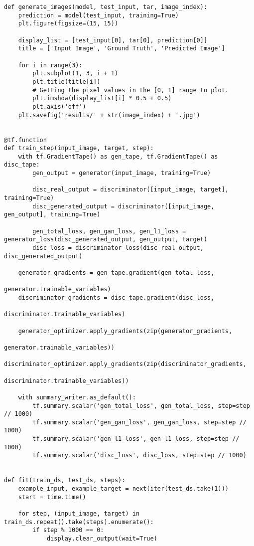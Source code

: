 \begin{lstlisting}
def generate_images(model, test_input, tar, image_index):
    prediction = model(test_input, training=True)
    plt.figure(figsize=(15, 15))

    display_list = [test_input[0], tar[0], prediction[0]]
    title = ['Input Image', 'Ground Truth', 'Predicted Image']

    for i in range(3):
        plt.subplot(1, 3, i + 1)
        plt.title(title[i])
        # Getting the pixel values in the [0, 1] range to plot.
        plt.imshow(display_list[i] * 0.5 + 0.5)
        plt.axis('off')
    plt.savefig('results/' + str(image_index) + '.jpg')


@tf.function
def train_step(input_image, target, step):
    with tf.GradientTape() as gen_tape, tf.GradientTape() as disc_tape:
        gen_output = generator(input_image, training=True)

        disc_real_output = discriminator([input_image, target], training=True)
        disc_generated_output = discriminator([input_image, gen_output], training=True)

        gen_total_loss, gen_gan_loss, gen_l1_loss = generator_loss(disc_generated_output, gen_output, target)
        disc_loss = discriminator_loss(disc_real_output, disc_generated_output)

    generator_gradients = gen_tape.gradient(gen_total_loss,
                                            generator.trainable_variables)
    discriminator_gradients = disc_tape.gradient(disc_loss,
                                                 discriminator.trainable_variables)

    generator_optimizer.apply_gradients(zip(generator_gradients,
                                            generator.trainable_variables))
    discriminator_optimizer.apply_gradients(zip(discriminator_gradients,
                                                discriminator.trainable_variables))

    with summary_writer.as_default():
        tf.summary.scalar('gen_total_loss', gen_total_loss, step=step // 1000)
        tf.summary.scalar('gen_gan_loss', gen_gan_loss, step=step // 1000)
        tf.summary.scalar('gen_l1_loss', gen_l1_loss, step=step // 1000)
        tf.summary.scalar('disc_loss', disc_loss, step=step // 1000)


def fit(train_ds, test_ds, steps):
    example_input, example_target = next(iter(test_ds.take(1)))
    start = time.time()

    for step, (input_image, target) in train_ds.repeat().take(steps).enumerate():
        if step % 1000 == 0:
            display.clear_output(wait=True)


\end{lstlisting}
